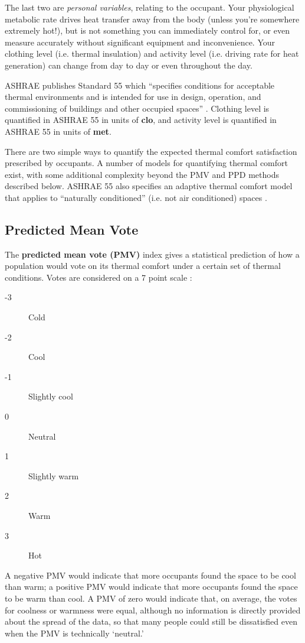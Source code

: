 \documentclass[10pt]{article}
\begin{document}
The last two are \textit{personal variables}, relating to the occupant.
Your physiological metabolic rate drives heat transfer away from the body (unless you're somewhere extremely hot!), but is not something you can immediately control for, or even measure accurately without significant equipment and inconvenience. Your clothing level (i.e. thermal insulation) and activity level (i.e. driving rate for heat generation) can change from day to day or even throughout the day.

ASHRAE publishes Standard 55 which ``specifies conditions for acceptable thermal environments and is intended for use in design, operation, and commissioning of buildings and other occupied spaces'' \cite{ASHRAE55-2017}. Clothing level is quantified in ASHRAE 55 in units of \textbf{clo}, and activity level is quantified in ASHRAE 55 in units of \textbf{met}.

There are two simple ways to quantify the expected thermal comfort satisfaction prescribed by occupants. A number of models for quantifying thermal comfort exist, with some additional complexity beyond the PMV and PPD methods described below. ASHRAE 55 also specifies an adaptive thermal comfort model that applies to ``naturally conditioned'' (i.e. not air conditioned) spaces \cite{ASHRAE55-2017}.

\subsection{Predicted Mean Vote}

The \textbf{predicted mean vote (PMV)} index gives a statistical prediction of how a population would vote on its thermal comfort under a certain set of thermal conditions. Votes are considered on a 7 point scale \cite{ASHRAE55-2017}:

\begin{description}
\item[-3] Cold
\item[-2] Cool
\item[-1] Slightly cool
\item[0] Neutral
\item[1] Slightly warm
\item[2] Warm
\item[3] Hot
\end{description}

A negative PMV would indicate that more occupants found the space to be cool than warm; a positive PMV would indicate that more occupants found the space to be warm than cool. A PMV of zero would indicate that, on average, the votes for coolness or warmness were equal, although no information is directly provided about the spread of the data, so that many people could still be dissatisfied even when the PMV is technically `neutral.'
\end{document}
